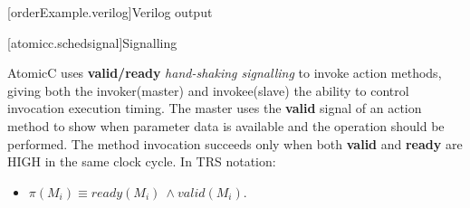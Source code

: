 [orderExample.verilog]{Verilog output}



[atomicc.schedsignal]{Signalling}

AtomicC uses \textbf{valid/ready} \textit{hand-shaking signalling}
\cite{Fletcher2009, AXISpec} to invoke action methods,
giving both the invoker(master) and invokee(slave) the ability to control invocation
execution timing.
The master uses the \textbf{valid} signal
of an action method to show when parameter data is available
and the operation should be performed.
The method invocation succeeds only when
both \textbf{valid} and \textbf{ready} are HIGH in the same clock cycle.
\newline
In TRS notation\cite[p.~22]{Hoe:Thesis}:
\begin{itemize}[label= ]
\item $\pi(M_{i}) \equiv ready(M_{i})\ \wedge valid(M_{i})$.
\end{itemize}
